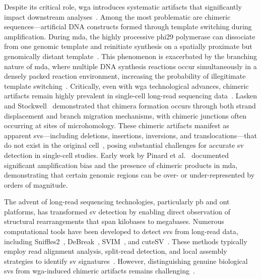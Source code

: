 \documentclass[pdflatex,sn-nature,lineno]{sn-jnl}%
\theoremstyle{thmstyleone}%
\theoremstyle{thmstyletwo}%
\theoremstyle{thmstylethree}%
\begin{document}
Despite its critical role, \gls{wga} introduces systematic artifacts that significantly impact downstream analyses~\cite{lu2023chimera,lu2023exploration, pinard2006assessment,lasken2007mechanism,chen2017singlecell}.
Among the most problematic are chimeric sequences—artificial DNA constructs formed through template switching during amplification.
During \gls{mda}, the highly processive phi29 polymerase can dissociate from one genomic template and reinitiate synthesis on a spatially proximate but genomically distant template~\cite{lasken2007mechanism,lu2023chimera}.
This phenomenon is exacerbated by the branching nature of \gls{mda}, where multiple DNA synthesis reactions occur simultaneously in a densely packed reaction environment, increasing the probability of illegitimate template switching~\cite{lasken2007mechanism}.
Critically, even with \gls{wga} technological advances, chimeric artifacts remain highly prevalent in single-cell long-read sequencing data~\cite{hard2023longread,gonzalez-pena2021accurate}.
Lasken and Stockwell~\cite{lasken2007mechanism} demonstrated that chimera formation occurs through both strand displacement and branch migration mechanisms, with chimeric junctions often occurring at sites of microhomology.
These chimeric artifacts manifest as apparent \glspl{sv}—including deletions, insertions, inversions, and translocations—that do not exist in the original cell~\cite{lu2023chimera,agyabeng2025evaluating}, posing substantial challenges for accurate \gls{sv} detection in single-cell studies.
Early work by Pinard et al.~\cite{pinard2006assessment} documented significant amplification bias and the presence of chimeric products in \gls{mda}, demonstrating that certain genomic regions can be over- or under-represented by orders of magnitude.

The advent of long-read sequencing technologies, particularly \gls{pb} and \gls{ont} platforms, has transformed \gls{sv} detection by enabling direct observation of structural rearrangements that span kilobases to megabases.
Numerous computational tools have been developed to detect \glspl{sv} from long-read data, including
Sniffles2~\cite{Sedlazeck2018,Smolka2024}, DeBreak~\cite{chen2023deciphering}, SVIM~\cite{heller2019svim}, and cuteSV~\cite{jiang2020longreadbased}.
These methods typically employ read alignment analysis, split-read detection, and local assembly strategies to identify \gls{sv} signatures~\cite{alkan2011genome}.
However, distinguishing genuine biological \glspl{sv} from \gls{wga}-induced chimeric artifacts remains challenging~\cite{kiguchi2021longread,lu2023exploration,kosugi2019comprehensive,mahmoud2019structural}.
\end{document}
